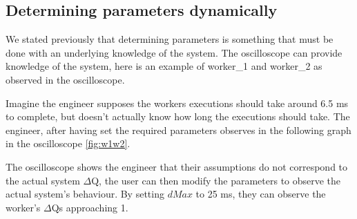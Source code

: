     \subsection{Determining parameters dynamically}
        We stated previously that determining parameters is something that must be done with an underlying knowledge of the system. The oscilloscope can provide knowledge of the system, here is an example of worker\_1 and worker\_2 as observed in the oscilloscope.

        Imagine the engineer supposes the workers executions should take around 6.5 ms to complete, but doesn't actually know how long the executions should take. The engineer, after having set the required parameters observes in the following graph in the oscilloscope \cref{fig:w1w2}.

    The oscilloscope shows the engineer that their assumptions do not correspond to the actual system $\Delta$Q, the user can then modify the parameters to observe the actual system's behaviour. By setting $dMax$ to 25 ms, they can observe the worker's $\Delta$Qs approaching 1.

